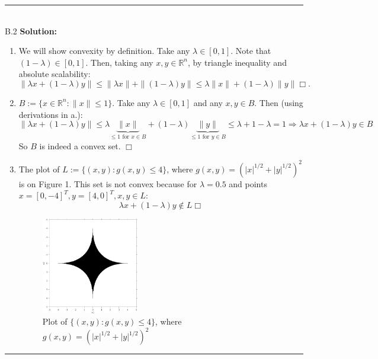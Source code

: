 \documentclass{article}
\newcommand{\field}[1]{\mathbb{#1}}
\newcommand{\1}{\mathbf{1}}
\newcommand{\R}{\field{R}} %
\begin{document}
\noindent\rule{\textwidth}{1pt}
\\
B.2 {\bf Solution:}\\
\begin{enumerate}
    \item We will show convexity by definition. Take any $\lambda \in [0,1]$. Note that $(1-\lambda) \in [0,1]$. Then, taking any $x, y \in \R^n$, by triangle inequality and absolute scalability:
    $$
    \|\lambda x + (1-\lambda)y\| \le \|\lambda x\| + \|(1-\lambda)y\| \le \lambda\|x\| + (1-\lambda)\|y\| \Box.
    $$
    \item $B := \{x \in \R^n: \|x\| \le 1\}$. Take any $\lambda \in [0,1]$ and any $x,y \in B$. Then (using derivations in a.):
    $$
    \|\lambda x + (1-\lambda)y\| \le \lambda\underbrace{\|x\|}_{\le 1 \text{ for } x \in B} + (1-\lambda)\underbrace{\|y\|}_{\le 1 \text{ for } y \in B} \le \lambda + 1 - \lambda = 1 \Rightarrow \lambda x + (1-\lambda)y \in B 
    $$
    So $B$ is indeed a convex set. $\Box$
    \item The plot of $L:=\{(x,y): g(x,y) \le 4\}$, where $g(x,y) = (|x|^{1/2} + |y|^{1/2})^2$ is on Figure 1. This set is not convex because for $\lambda = 0.5$ and points $x = [0,-4]^T, y =[4,0]^T, x,y \in L$:
    $$\lambda x + (1-\lambda)y \not\in L \Box$$
    
   
    \begin{figure}[h!]
            \centering
            \includegraphics[width=0.4\textwidth]{hw2/b2.png}
            \caption{Plot of $\{(x,y): g(x,y) \le 4\}$, where $g(x,y) = (|x|^{1/2} + |y|^{1/2})^2$}
            \label{figure:B2}
    \end{figure}
\end{enumerate}   
\noindent\rule{\textwidth}{1pt}
\end{document}
